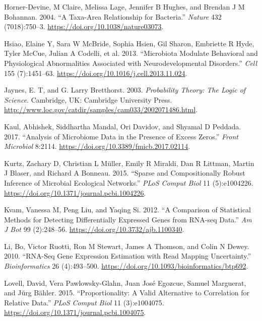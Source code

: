 \documentclass[onecolumn]{book}
\theoremstyle{definition}
\theoremstyle{definition}
\theoremstyle{definition}
\theoremstyle{remark}
\begin{document}
\leavevmode\hypertarget{ref-Horner-Devine:2004aa}{}%
Horner-Devine, M Claire, Melissa Lage, Jennifer B Hughes, and Brendan J
M Bohannan. 2004. ``A Taxa-Area Relationship for Bacteria.''
\emph{Nature} 432 (7018):750--3.
\url{https://doi.org/10.1038/nature03073}.

\leavevmode\hypertarget{ref-Hsiao:2013}{}%
Hsiao, Elaine Y, Sara W McBride, Sophia Hsien, Gil Sharon, Embriette R
Hyde, Tyler McCue, Julian A Codelli, et al. 2013. ``Microbiota Modulate
Behavioral and Physiological Abnormalities Associated with
Neurodevelopmental Disorders.'' \emph{Cell} 155 (7):1451--63.
\url{https://doi.org/10.1016/j.cell.2013.11.024}.

\leavevmode\hypertarget{ref-Jaynes:2003}{}%
Jaynes, E. T, and G. Larry Bretthorst. 2003. \emph{Probability Theory:
The Logic of Science}. Cambridge, UK: Cambridge University Press.
\url{http://www.loc.gov/catdir/samples/cam033/2002071486.html}.

\leavevmode\hypertarget{ref-Kaul:2017aa}{}%
Kaul, Abhishek, Siddhartha Mandal, Ori Davidov, and Shyamal D Peddada.
2017. ``Analysis of Microbiome Data in the Presence of Excess Zeros.''
\emph{Front Microbiol} 8:2114.
\url{https://doi.org/10.3389/fmicb.2017.02114}.

\leavevmode\hypertarget{ref-Kurtz:2015}{}%
Kurtz, Zachary D, Christian L Müller, Emily R Miraldi, Dan R Littman,
Martin J Blaser, and Richard A Bonneau. 2015. ``Sparse and
Compositionally Robust Inference of Microbial Ecological Networks.''
\emph{PLoS Comput Biol} 11 (5):e1004226.
\url{https://doi.org/10.1371/journal.pcbi.1004226}.

\leavevmode\hypertarget{ref-Kvam:2012}{}%
Kvam, Vanessa M, Peng Liu, and Yaqing Si. 2012. ``A Comparison of
Statistical Methods for Detecting Differentially Expressed Genes from
RNA-seq Data.'' \emph{Am J Bot} 99 (2):248--56.
\url{https://doi.org/10.3732/ajb.1100340}.

\leavevmode\hypertarget{ref-Li:2010aa}{}%
Li, Bo, Victor Ruotti, Ron M Stewart, James A Thomson, and Colin N
Dewey. 2010. ``RNA-Seq Gene Expression Estimation with Read Mapping
Uncertainty.'' \emph{Bioinformatics} 26 (4):493--500.
\url{https://doi.org/10.1093/bioinformatics/btp692}.

\leavevmode\hypertarget{ref-Lovell:2015}{}%
Lovell, David, Vera Pawlowsky-Glahn, Juan José Egozcue, Samuel
Marguerat, and Jürg Bähler. 2015. ``Proportionality: A Valid Alternative
to Correlation for Relative Data.'' \emph{PLoS Comput Biol} 11
(3):e1004075. \url{https://doi.org/10.1371/journal.pcbi.1004075}.
\end{document}
